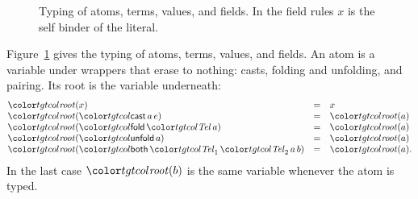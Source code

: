 \begin{figure}
\small
\color{tgtcol}
\color{black}
\caption{Typing of atoms, terms, values, and fields. In the field rules $x$ is the self binder of the literal.}
\label{fig:terms}
\end{figure}

Figure~\ref{fig:terms} gives the typing of atoms, terms, values, and fields. An atom is a variable under wrappers that erase to nothing: casts, folding and unfolding, and pairing. Its root is the variable underneath:
\[
\begin{array}{@{}lcl@{}}
\rt{x} & = & x \\
\rt{\ev{cast}\,a\,e} & = & \rt{a} \\
\rt{\ev{fold}\,\tel\,a} & = & \rt{a} \\
\rt{\ev{unfold}\,a} & = & \rt{a} \\
\rt{\ev{both}\,\tel_1\,\tel_2\,a\,b} & = & \rt{a} .
\end{array}
\]
In the last case $\rt{b}$ is the same variable whenever the atom is typed.

